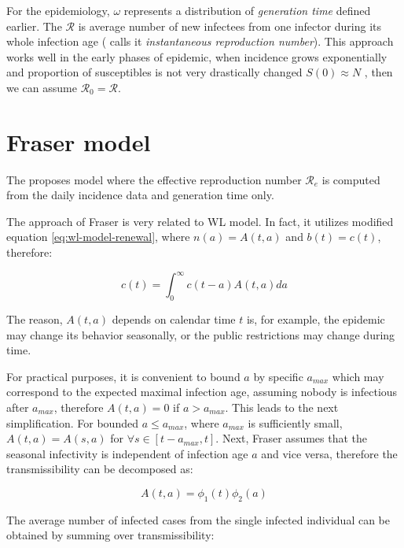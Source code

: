 \documentclass[
  digital, %
  oneside, %
  lof,     %
  lot,     %
]{fithesis4}
\begin{document}
For the epidemiology, $\omega$ represents
a distribution of \textit{generation time} defined earlier.
The $\mathcal{R}$ is average number of new infectees from one infector
during its whole infection age (\cite{fraser2007} 
calls it \textit{instantaneous reproduction number}).
This approach works well in the early phases of epidemic,
when incidence grows exponentially
and proportion of susceptibles is not very drastically
changed $S(0) \approx N$ \cite{park2021}, then we can assume 
$\mathcal{R}_0 = \mathcal{R}$.


\section{Fraser model}
\label{sec:fraser-model}

The \cite{fraser2007} proposes model where the effective 
reproduction number $\mathcal{R}_e$ is computed from the 
daily incidence data and generation time only.

The approach of Fraser is very related to WL
model. In fact, it utilizes modified equation
\eqref{eq:wl-model-renewal}, where 
$n(a) = A(t, a)$ and $b(t) = c(t)$, therefore:

\begin{equation}
  c( t ) = \int^{\infty}_0 c ( t - a ) A ( t, a ) da
\end{equation}

The reason, $A(t, a)$ depends on calendar time $t$ is,
for example, 
the epidemic may change its behavior seasonally, or the 
public restrictions may change during time.

For practical purposes, it is convenient to bound $a$ 
by specific $a_{max}$ which may correspond to the expected
maximal infection age, assuming nobody is infectious after 
$a_{max}$, therefore $A(t, a) = 0$ if $a > a_{max}$.
This leads to the next simplification.
For bounded $a \leq a_{max}$, where $a_{max}$ is 
sufficiently small, $A(t, a) = A(s, a)$ for 
$\forall s \in \left[ t - a_{max}, t \right]$.
Next, Fraser assumes that the seasonal infectivity is 
independent of infection age $a$ and vice versa, therefore
the transmissibility can be decomposed as:

\begin{equation}
A(t, a) = \phi_1(t) \phi_2(a)
\end{equation}

The average number of infected cases from the single infected 
individual can be obtained by summing over transmissibility:
\end{document}
